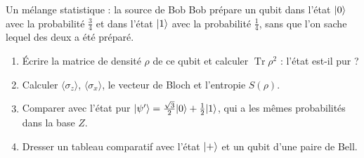 \begin{exercice}{Un mélange statistique : la source de Bob}\label{ex:melange}
Bob prépare un qubit dans l'état $|0\rangle$ avec la probabilité $\frac34$ et dans l'état $|1\rangle$ avec
la probabilité $\frac14$, sans que l'on sache lequel des deux a été préparé.
\begin{enumerate}[label=\arabic*.,nosep]
  \item Écrire la matrice de densité $\rho$ de ce qubit et calculer $\operatorname{Tr}\rho^2$ :
        l'état est-il pur ?
  \item Calculer $\langle\sigma_z\rangle$, $\langle\sigma_x\rangle$, le vecteur de Bloch et l'entropie
        $S(\rho)$.
  \item Comparer avec l'état pur $|\psi'\rangle=\frac{\sqrt3}{2}|0\rangle+\frac12|1\rangle$, qui a les mêmes
        probabilités dans la base $Z$.
  \item Dresser un tableau comparatif avec l'état $|+\rangle$ et un qubit d'une paire de Bell.
\end{enumerate}
\end{exercice}
